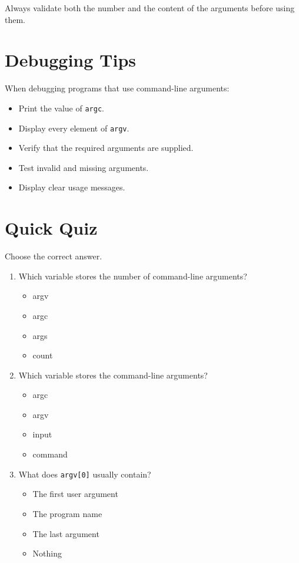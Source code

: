 \documentclass[12pt,openany]{book}
\begin{document}
Always validate both the number and the content of the arguments before using them.

\section{Debugging Tips}

When debugging programs that use command-line arguments:

\begin{itemize}
    \item Print the value of \texttt{argc}.
    \item Display every element of \texttt{argv}.
    \item Verify that the required arguments are supplied.
    \item Test invalid and missing arguments.
    \item Display clear usage messages.
\end{itemize}

\section{Quick Quiz}

Choose the correct answer.

\begin{enumerate}
    \item Which variable stores the number of command-line arguments?
    \begin{itemize}
        \item argv
        \item argc
        \item args
        \item count
    \end{itemize}

    \item Which variable stores the command-line arguments?
    \begin{itemize}
        \item argc
        \item argv
        \item input
        \item command
    \end{itemize}

    \item What does \texttt{argv[0]} usually contain?
    \begin{itemize}
        \item The first user argument
        \item The program name
        \item The last argument
        \item Nothing
    \end{itemize}
\end{enumerate}
\end{document}

